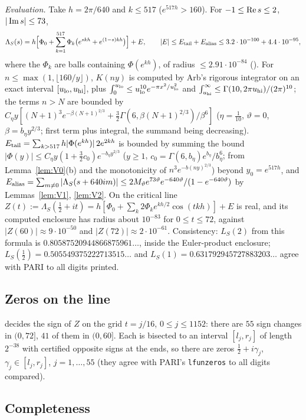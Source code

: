 \emph{Evaluation.} Take $h=2\pi/640$ and $k\le517$ ($e^{517h}>160$). For $-1\le\operatorname{Re} s\le2$, $|\operatorname{Im} s|\le73$,
\[
\Lambda_S(s)=h\Bigl[\Phi_0+\sum_{k=1}^{517}\Phi_k\bigl(e^{skh}+e^{(1-s)kh}\bigr)\Bigr]+E,\qquad|E|\le E_{\rm tail}+E_{\rm alias}\le3.2\cdot10^{-100}+4.4\cdot10^{-95},
\]
where the $\Phi_k$ are balls containing $\Phi(e^{kh})$, of radius $\le2.91\cdot10^{-84}$ (). For $n\le\max(1,\lfloor160/y\rfloor)$, $K(ny)$ is computed by Arb's rigorous integrator on an exact interval $[u_{\rm lo},u_{\rm hi}]$, plus $\int_0^{u_{\rm lo}}\le u_{\rm lo}^{10}e^{-\pi x^2/u_{\rm lo}^2}$ and $\int_{u_{\rm hi}}^\infty\le\Gamma(10,2\pi u_{\rm hi})/(2\pi)^{10}$; the terms $n>N$ are bounded by $C_\eta y[(N+1)^3e^{-\beta(N+1)^{2/3}}+\frac32\Gamma(6,\beta(N+1)^{2/3})/\beta^6]$ ($\eta=\frac1{10}$, $\vartheta=0$, $\beta=b_\eta y^{2/3}$; first term plus integral, the summand being decreasing). $E_{\rm tail}=\sum_{k>517}h|\Phi(e^{kh})|\,2e^{2kh}$ is bounded by summing the bound $|\Phi(y)|\le C_\eta y(1+\frac32c_0)e^{-b_\eta y^{2/3}}$ ($y\ge1$, $c_0=\Gamma(6,b_\eta)e^{b_\eta}/b_\eta^6$; from Lemma~\ref{lem:V0}(b) and the monotonicity of $n^3e^{-b(ny)^{2/3}}$) beyond $y_0=e^{517h}$, and $E_{\rm alias}=\sum_{m\ne0}|\Lambda_S(s+640im)|\le2M_\vartheta e^{73\vartheta}e^{-640\vartheta}/(1-e^{-640\vartheta})$ by Lemmas~\ref{lem:V1}, \ref{lem:V2}. On the critical line $Z(t):=\Lambda_S(\frac12+it)=h[\Phi_0+\sum_k2\Phi_ke^{kh/2}\cos(tkh)]+E$ is real, and its computed enclosure has radius about $10^{-83}$ for $0\le t\le72$, against $|Z(60)|\approx9\cdot10^{-50}$ and $|Z(72)|\approx2\cdot10^{-61}$. Consistency: $L_S(2)$ from this formula is $0.80587520944866875961\ldots$, inside the Euler-product enclosure; $L_S(\frac12)=0.505549375222713515\ldots$ and $L_S(1)=0.631792945727883203\ldots$ agree with PARI to all digits printed.

\subsection{Zeros on the line}
 decides the sign of $Z$ on the grid $t=j/16$, $0\le j\le1152$: there are $55$ sign changes in $(0,72]$, $41$ of them in $(0,60]$. Each is bisected to an interval $[l_j,r_j]$ of length $2^{-38}$ with certified opposite signs at the ends, so there are zeros $\frac12+i\gamma_j$, $\gamma_j\in[l_j,r_j]$, $j=1,\dots,55$ (they agree with PARI's \texttt{lfunzeros} to all digits compared).

\subsection{Completeness}

